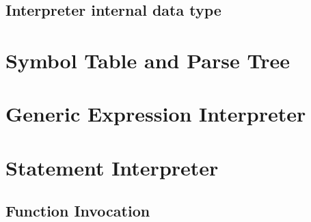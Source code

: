 \subsection{Interpreter internal data type}



\section{Symbol Table and Parse Tree}


\section{Generic Expression Interpreter}


\section{Statement Interpreter}

\subsection{Function Invocation}
